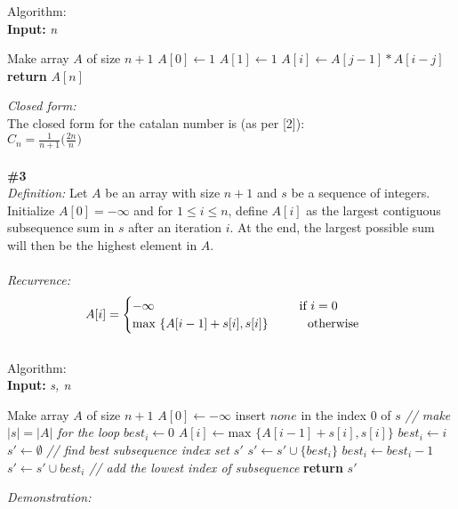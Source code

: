 \documentclass{article}
\newcommand\tab[1][1cm]{\hspace*{#1}}
\begin{document}
\newpage
Algorithm:\\
\textbf{Input:} \textit{n}
\begin{algorithmic}
\State Make array $A$ of size $n + 1$
\State $A[0] \gets 1$
\State $A[1] \gets 1$
    \State $A[i] \gets A[j-1]*A[i-j]$
  \EndFor
\EndFor
\State \textbf{return} $A[n]$
\end{algorithmic}
\textit{Closed form:}
\\
The closed form for the catalan number is (as per [2]):\\
$C_n = \frac{1}{n+1}\bigg(\frac{2n}{n}\bigg)$
\\
\\
\textbf{\#3}\\
\textit{Definition:} Let $A$ be an array with size $n+1$ and $s$ be a sequence of integers. Initialize $A[0] = - \infty$ and for $1 \leq i \leq n$, define $A[i]$ as the largest contiguous subsequence sum in $s$ after an iteration $i$.  At the end, the largest possible sum will then be the highest element in $A$.\\
\\
\textit{Recurrence:}
\begin{gather*}
A[i] =
\begin{cases}
-\infty \tab\tab\tab\tab\text{   } $if $i = 0 \\
\text{max } \{A[i-1] + s[i], s[i]\} \tab $ otherwise $
\end{cases}
\end{gather*}\\
Algorithm:\\
\textbf{Input:} \textit{s, n}
\begin{algorithmic}
\State Make array $A$ of size $n + 1$
\State $A[0] \gets -\infty$
\State insert $none$ in the index $0$ of $s$ \textit{// make $|s| = |A|$ for the loop}
\State $best_i \gets 0$
  \State $A[i] \gets \text{max } \{A[i-1]+s[i], s[i] \}$
    \State $best_i \gets i$
  \EndIf
\EndFor
\State $s' \gets \emptyset$ \textit{ // find best subsequence index set $s'$}
  \State $s' \gets s' \cup \{ best_i \}$
  \State $best_i \gets best_i - 1$
\EndWhile
\State $s' \gets s' \cup best_i$ \textit{// add the lowest index of subsequence}
\State \textbf{return} $s'$\\
\end{algorithmic}
\textit{Demonstration:}
\\\\
\end{document}
